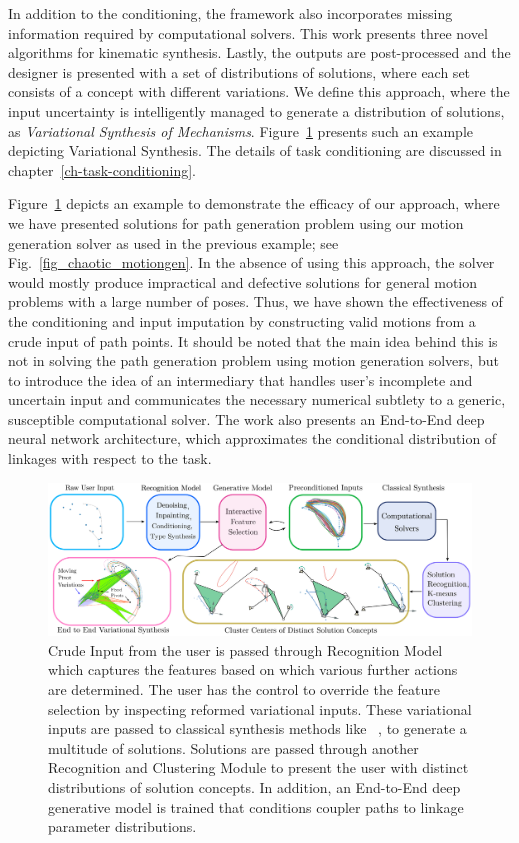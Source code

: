 In addition to the conditioning, the framework also incorporates missing information required by computational solvers. This work presents three novel algorithms for kinematic synthesis.
Lastly, the outputs are post-processed and the designer is presented with a set of distributions of solutions, where each set consists of a concept with different variations.
We define this approach, where the input uncertainty is intelligently managed to generate a distribution of solutions, as \emph{Variational Synthesis of Mechanisms}. Figure~\ref{fig_example_overview} presents such an example depicting Variational Synthesis. The details of task conditioning are discussed in chapter~\ref{ch-task-conditioning}.

Figure~\ref{fig_example_overview}  depicts an example to demonstrate the efficacy of our approach, where we have presented solutions for path generation problem using our motion generation solver as used in the previous example; see Fig.~\ref{fig_chaotic_motiongen}. In the absence of using this approach, the solver would mostly produce impractical and defective solutions for general motion problems with a large number of poses. Thus, we have shown the effectiveness of the conditioning and input imputation by constructing valid motions from a crude input of path points.
It should be noted that the main idea behind this is not in solving the path generation problem using motion generation solvers, but to introduce the idea of an intermediary that handles user's incomplete and uncertain input and communicates the necessary numerical subtlety to a generic, susceptible computational solver.
The work also presents an End-to-End deep neural network architecture, which approximates the conditional distribution of linkages with respect to the task.

\begin{figure}
\centering
\includegraphics[width=\textwidth]{jmd-19/figure/fig_overview.eps}
  \caption{Crude Input from the user is passed through Recognition Model which captures the features based on which various further actions are determined. The user has the control to override the feature selection by inspecting reformed variational inputs. These variational inputs are passed to classical synthesis methods like ~\cite{generalfitting-JCISE},\cite{shrinathpurwar2017} to generate a multitude of solutions. Solutions are passed through another Recognition and Clustering Module to present the user with distinct distributions of solution concepts. In addition, an End-to-End deep generative model is trained that conditions coupler paths to linkage parameter distributions.}
\label{fig_example_overview}
\end{figure}

